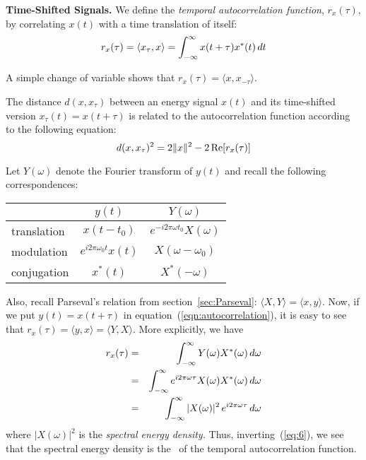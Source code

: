 \begin{define}{\bf Time-Shifted Signals. }  We define the 
\emph{temporal autocorrelation function}, $r_{x}(\tau)$, by
correlating $x(t)$ with a time translation of itself:
\begin{equation}
\label{eqn:autocorrelation} 
r_{x}(\tau) = \langle x_\tau,x \rangle 
             = \int_{-\infty}^{\infty} x(t+\tau)x^*(t)\,dt\\
\end{equation}
\end{define}
A simple change of variable %
shows that $r_{x}(\tau) = \langle x,x_{-\tau} \rangle$.

The distance $d(x, x_\tau)$ between an energy signal $x(t)$ and its
time-shifted version $x_\tau(t) = x(t+\tau)$ is related to %
the autocorrelation function according to the following equation: 
\[
d(x, x_\tau)^2 = 2\|x\|^2 - 2 \,\mbox{Re}[r_{x}(\tau)]
\] 

Let $Y(\omega)$ denote the Fourier transform of $y(t)$ and recall the
following correspondences:\\
\begin{center}
\begin{tabular}{l|c|c}
&$y(t)$&$Y(\omega)$\\
\hline
translation & $x(t-t_0)$ & $e^{-i2\pi\omega t_0}X(\omega)$\\
modulation & $e^{i2\pi\omega_0t}x(t)$ & $X(\omega-\omega_0)$\\
conjugation & $x^*(t)$ &$ X^*(-\omega)$
\end{tabular}
\end{center}
\vspace{4mm}
Also, recall Parseval's relation from section~\ref{sec:Parseval}: 
$\langle X,Y\rangle = \langle x,y\rangle$. 
Now, if we put $y(t) = x(t+\tau)$ in
equation~(\ref{eqn:autocorrelation}), it is easy to see that
$r_{x}(\tau) = \langle y,x\rangle = \langle Y,X\rangle$.  More
explicitly, we have 
\begin{eqnarray}
r_{x}(\tau)&=&\int_{-\infty}^{\infty} Y(\omega) X^*(\omega)\,d\omega \nonumber \\
&=&\int_{-\infty}^{\infty} e^{i2\pi\omega\tau}X(\omega) X^*(\omega)\,d\omega\nonumber\\
&=& \int_{-\infty}^{\infty}  |X(\omega)|^2 \,e^{i2\pi \omega \tau}\,d\omega 
\label{eq:6}
\end{eqnarray}
where $|X(\omega)|^2$ is the \emph{spectral energy density.}  Thus,
inverting~(\ref{eq:6}), we see that the spectral energy density is the
\FT\ of the temporal autocorrelation function.

